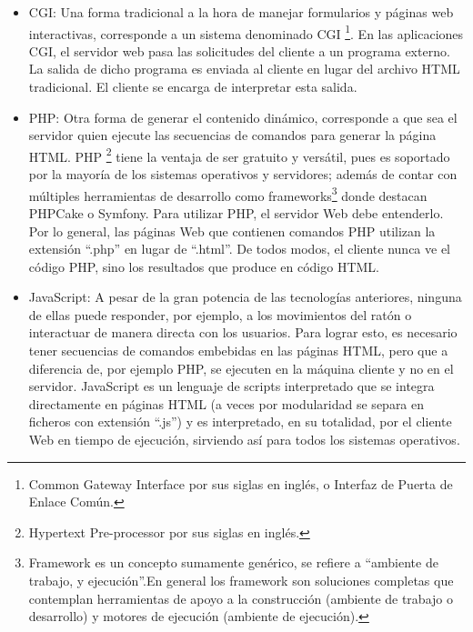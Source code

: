 \begin{itemize}
 \item CGI: Una forma tradicional a la hora de manejar formularios y páginas web interactivas, corresponde a un sistema denominado
	    CGI \footnote{Common Gateway Interface por sus siglas en inglés, o Interfaz de Puerta de Enlace Común.}. En las aplicaciones
	    CGI, el servidor web pasa las solicitudes del cliente a un programa externo.  La salida de dicho programa es enviada al cliente 
	    en lugar del archivo HTML tradicional. El cliente se encarga de interpretar esta salida.

 \item PHP: Otra forma de generar el contenido dinámico, corresponde a que sea el servidor quien ejecute las secuencias de comandos para
	    generar la página HTML. PHP \footnote{Hypertext Pre-processor por sus siglas en inglés.}  tiene la ventaja de ser gratuito y 
	    versátil, pues es soportado por la mayoría de los sistemas operativos y servidores; además de contar con múltiples herramientas
	    de desarrollo como frameworks\footnote{Framework es un concepto sumamente genérico, se refiere a “ambiente de trabajo, 
	    y ejecución”.En general los framework son soluciones completas que contemplan herramientas de apoyo a la construcción 
	    (ambiente de trabajo o desarrollo) y motores de ejecución (ambiente de ejecución).} donde destacan PHPCake o Symfony. 
	    Para utilizar PHP, el servidor Web debe entenderlo. Por lo general, las páginas Web que contienen comandos PHP utilizan la
	    extensión “.php” en lugar de “.html”. De todos modos, el cliente nunca ve el código PHP, sino los resultados que produce
	    en código HTML.
    

 \item JavaScript: A pesar de la gran potencia de las tecnologías anteriores, ninguna de ellas puede responder, por ejemplo,
		   a los movimientos del ratón o interactuar de manera directa con los usuarios.
		   Para lograr esto, es necesario tener secuencias de comandos embebidas en las páginas HTML, pero que a diferencia
		   de, por ejemplo PHP,  se ejecuten en la máquina cliente y no en el servidor.
		   JavaScript es un lenguaje de scripts interpretado que se integra directamente en páginas HTML (a veces por 
		   modularidad se separa en ficheros con extensión “.js”) y es interpretado, en su totalidad, por el cliente Web 
		   en tiempo de ejecución, sirviendo así para todos los sistemas operativos.
 
 \end{itemize}

